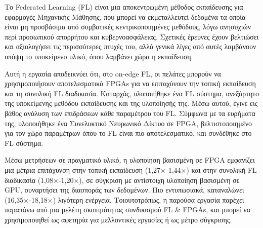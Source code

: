 \documentclass[
	12pt, %
	english,
	onehalfspacing, %
	liststotoc, %
	toctotoc, %
	parskip, %
	headsepline, %
]{MastersDoctoralThesis} %
\begin{document}
\begin{abstractgreek}
    
    Το
    Federated Learning (FL)
    είναι μια αποκεντρωμένη μέθοδος εκπαίδευσης για εφαρμογές Μηχανικής Μάθησης, που μπορεί να εκμεταλλευτεί δεδομένα τα οποία είναι μη προσβάσιμα από συμβατικές κεντρικοποιημένες μεθόδους, λόγω ανησυχιών περί προσωπικού απορρήτου και κυβερνοασφάλειας. Σχετικές έρευνες έχουν βελτιώσει και αξιολογήσει τις περισσότερες πτυχές του, αλλά γενικά λίγες από αυτές λαμβάνουν υπόψη το υποκείμενο υλικό, όπου λαμβάνει χώρα η εκπαίδευση.

    Αυτή η εργασία αποδεικνύει ότι, στο
    on-edge FL,
    οι πελάτες μπορούν να χρησιμοποιήσουν αποτελεσματικά
    FPGAs
    για να επιταχύνουν την τοπική εκπαίδευση και τη συνολική
    FL
    διαδικασία. Καταρχάς, υλοποιήθηκε ένα
    FL
    σύστημα, ανεξάρτητο της υποκείμενης μεθόδου εκπαίδευσης και της υλοποίησής της. Μέσω αυτού, έγινε εις βάθος ανάλυση των επιδράσεων κάθε παραμέτρου του
    FL.
    Σύμφωνα με τα ευρήματα της, υλοποιήθηκε ένα Συνελυκτικό Νευρωνικό Δίκτυο σε
    FPGA,
    βελτιστοποιημένο για τον χώρο παραμέτρων όπου το
    FL
    είναι πιο αποτελεσματικό, και συνδέθηκε στο
    FL
    σύστημα.

    Μέσω μετρήσεων σε πραγματικό υλικό, η υλοποίηση βασισμένη σε
    FPGA
    εμφανίζει μια μέτρια επιτάχυνση στην τοπική εκπαίδευση (1,27$\times$-1,44$\times$) και στην συνολική
    FL
    διαδικασία (1,08$\times$-1,20$\times$), σε σύγκριση με αντίστοιχη υλοποίηση βασισμένη σε
    GPU,
    συναρτήσει της διασποράς των δεδομένων. Πιο εντυπωσιακά, καταναλώνει (16,35$\times$-18,18$\times$) λιγότερη ενέργεια. Τοιουτοτρόπως, η παρούσα εργασία παρέχει παραπάνω από μια μελέτη σκοπιμότητας συνδυασμού
    FL \& FPGAs,
    και μπορεί να χρησιμοποιηθεί ως αφετηρία για μελλοντικές εργασίες ή ως μέτρο σύγκρισης.
    
\end{abstractgreek}
\end{document}
